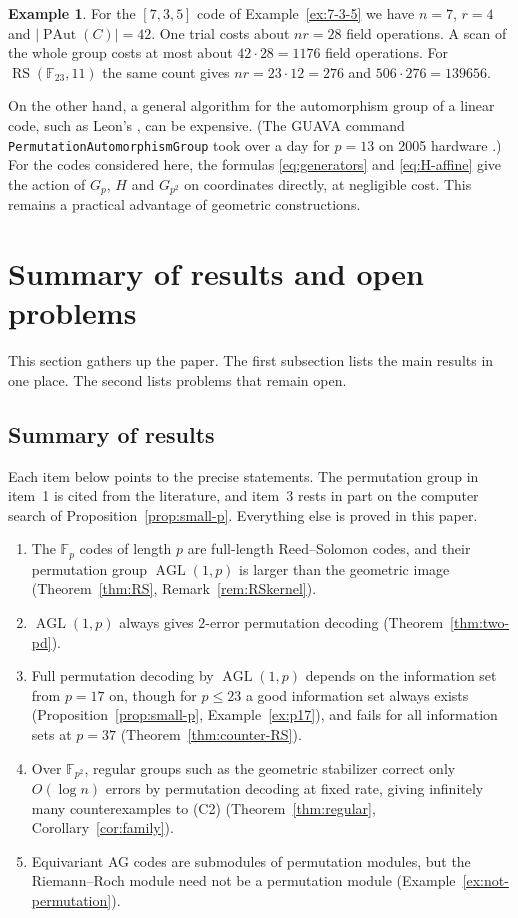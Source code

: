\documentclass[12pt,letterpaper]{article}
\theoremstyle{definition}
\newtheorem{example}[theorem]{Example}
\theoremstyle{remark}
\numberwithin{equation}{section}
\newcommand{\F}{\mathbb{F}}
\newcommand{\RS}{\operatorname{RS}}
\newcommand{\PAut}{\operatorname{PAut}}
\newcommand{\AGL}{\operatorname{AGL}}
\begin{document}
\begin{example}\label{ex:cost}
For the $[7,3,5]$ code of Example~\ref{ex:7-3-5} we have $n=7$, $r=4$ and
$|\PAut(C)|=42$. One trial costs about $nr=28$ field operations. A scan of
the whole group costs at most about $42\cdot28=1176$ field operations.
For $\RS(\F_{23},11)$ the same count gives $nr=23\cdot12=276$ and
$506\cdot276=139656$.
\end{example}

On the other hand, a general algorithm for the automorphism group of a
linear code, such as Leon's \cite{Le82}, can be expensive.  (The GUAVA
command \texttt{PermutationAutomorphismGroup} took over a day for $p=13$
on 2005 hardware \cite{Jo05}.)  For the codes considered here, the
formulas \eqref{eq:generators} and \eqref{eq:H-affine} give the action
of $G_p$, $H$ and $G_{p^2}$ on coordinates directly, at negligible cost.
This remains a practical advantage of geometric constructions.

\section{Summary of results and open problems}\label{sec:problems}

This section gathers up the paper. The first subsection lists the main
results in one place. The second lists problems that remain open.

\subsection{Summary of results}

Each item below points to the precise statements. The permutation group
in item~1 is cited from the literature, and item~3 rests in part on the
computer search of Proposition~\ref{prop:small-p}. Everything else is
proved in this paper.

\begin{enumerate}
\item The $\F_p$ codes of length $p$ are full-length Reed--Solomon codes,
and their permutation group $\AGL(1,p)$ is larger than the geometric
image (Theorem~\ref{thm:RS}, Remark~\ref{rem:RSkernel}).
\item $\AGL(1,p)$ always gives $2$-error permutation decoding
(Theorem~\ref{thm:two-pd}).
\item Full permutation decoding by $\AGL(1,p)$ depends on the information
set from $p=17$ on, though for $p\le23$ a good information set always
exists (Proposition~\ref{prop:small-p}, Example~\ref{ex:p17}), and fails for all information sets at $p=37$
(Theorem~\ref{thm:counter-RS}).
\item Over $\F_{p^2}$, regular groups such as the geometric stabilizer
correct only $O(\log n)$ errors by permutation decoding at fixed rate,
giving infinitely many counterexamples to (C2)
(Theorem~\ref{thm:regular}, Corollary~\ref{cor:family}).
\item Equivariant AG codes are submodules of permutation modules, but the
Riemann--Roch module need not be a permutation module
(Example~\ref{ex:not-permutation}).
\end{enumerate}
\end{document}
